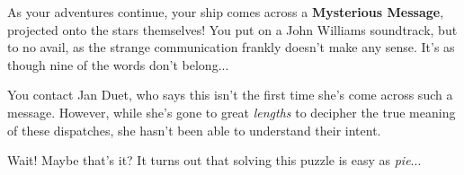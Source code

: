 As your adventures continue, your ship comes across a \textbf{Mysterious
Message}, projected onto the stars themselves! You put on a John
Williams soundtrack, but to no avail, as the strange communication
frankly doesn't make any sense. It's as though nine of the
words don't belong...

You contact Jan Duet, who says this isn't the first time she's
come across such a message. However, while she's gone
to great \textit{lengths} to decipher the true meaning of
these dispatches, she hasn't been able to understand their intent.

Wait! Maybe that's it? It turns out that solving this puzzle
is easy as \textit{pie}...
